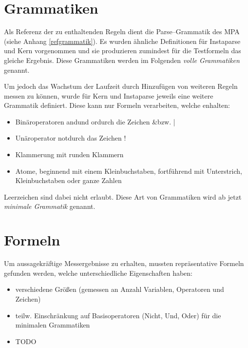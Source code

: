 \documentclass[ngerman,a4paper,abstracton,open=right,twoside=false,toc=listofnumbered,bibtotocnumbered]{scrreprt}
\begin{document}
\section{Grammatiken}

Als Referenz der zu enthaltenden Regeln dient die Parse--Grammatik des MPA (siehe Anhang \ref{refgrammatik}). Es wurden ähnliche Definitionen für Instaparse und Kern vorgenommen und sie produzieren zumindest für die Testformeln das gleiche Ergebnis. Diese Grammatiken werden im Folgenden \emph{volle Grammatiken} genannt.

Um jedoch das Wachstum der Laufzeit durch Hinzufügen von weiteren Regeln messen zu können, wurde für Kern und Instaparse jeweils eine weitere Grammatik definiert. Diese kann nur Formeln verarbeiten, welche enhalten:

\begin{itemize}
	\item Binäroperatoren \glqq and\grqq und \glqq or\grqq durch die Zeichen \glqq \&\grqq bzw. \glqq |\grqq
	\item Unäroperator \glqq not\grqq durch das Zeichen \glqq !\grqq
	\item Klammerung mit runden Klammern
	\item Atome, beginnend mit einem Kleinbuchstaben, fortführend mit Unterstrich, Kleinbuchstaben oder ganze Zahlen
\end{itemize}

Leerzeichen sind dabei nicht erlaubt. Diese Art von Grammatiken wird ab jetzt \emph{minimale Grammatik} genannt.

\section{Formeln}

Um aussagekräftige Messergebnisse zu erhalten, mussten repräsentative Formeln gefunden werden, welche unterschiedliche Eigenschaften haben:

\begin{itemize}
	\item verschiedene Größen (gemessen an Anzahl Variablen, Operatoren und Zeichen)
	\item teilw. Einschränkung auf Basisoperatoren (Nicht, Und, Oder) für die minimalen Grammatiken
	\item TODO
\end{itemize}
\end{document}
